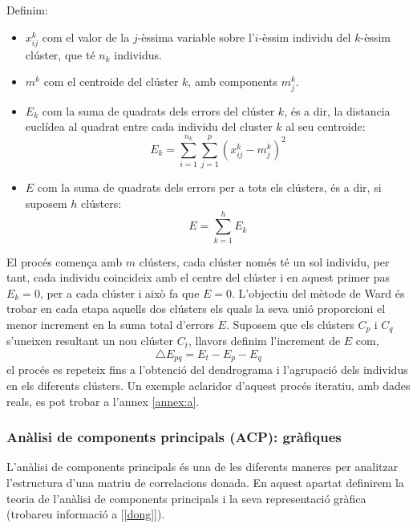 \documentclass[english]{article}
\begin{document}
Definim:
\begin{itemize}
\item $x_{ij}^k$ com el valor de la $j$-èssima variable sobre l'$i$-èssim individu del $k$-èssim clúster, que té $n_k$ individus.
\item $m^k$ com el centroide del clúster $k$, amb components $m_{j}^k$.
\item $E_k$ com la suma de quadrats dels errors del clúster $k$, és a dir, la distancia euclídea al quadrat entre cada individu del cluster $k$ al seu centroide:
\begin{equation*}
E_k = \sum_{i=1}^{n_k}\sum_{j=1}^{p}(x_{ij}^k - m_{j}^k)^2
\end{equation*}
\item $E$ com la suma de quadrats dels errors per a tots els clústers, és a dir, si suposem $h$ clústers:
\begin{equation*}
E = \sum_{k=1}^{h} E_k
\end{equation*}
\end{itemize}
El procés comen\c{c}a amb $m$ clústers, cada clúster només té un sol individu, per tant, cada individu coincideix amb el centre del clúster i en aquest primer pas $E_k=0$, per a cada clúster i això fa que $E=0$. L'objectiu del mètode de Ward és trobar en cada etapa aquells dos clústers els quals la seva unió proporcioni el menor increment en la suma total d'errors $E$. Suposem que els clústers $C_p$ i $C_q$ s'uneixen resultant un nou clúster $C_t$, llavors definim l'increment de $E$ com,
\begin{equation*}
\bigtriangleup E_{pq} = E_t - E_p - E_q
\end{equation*}
el procés es repeteix fins a l'obtenció del dendrograma i l'agrupació dels individus en els diferents clústers. Un exemple aclaridor d'aquest procés iteratiu, amb dades reals, es pot trobar a l'annex \ref{annex:a}.
\newpage
\subsubsection{Anàlisi de components principals (ACP): gràfiques}
L'anàlisi de components principals és una de les diferents maneres per analitzar l'estructura d'una matriu de correlacions donada. En aquest apartat definirem la teoria de l'anàlisi de components principals i la seva representació gràfica (trobareu informació a [\ref{dong}]).
\\
\end{document}
